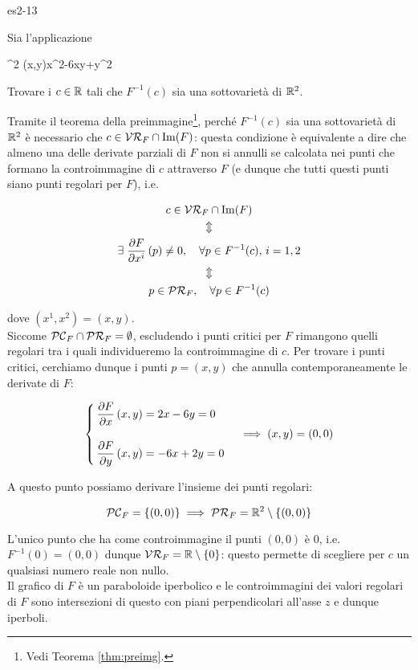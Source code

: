 {es2-13}
{
Sia l'applicazione

	{\R^{2}}{\R}
	{(x,y)}{x^{2}-6xy+y^{2}}

Trovare i $ c \in \mathbb{R} $ tali che $ F^{-1}(c) $ sia una sottovarietà di $ \mathbb{R}^{2} $.
}
{
Tramite il teorema della preimmagine\footnote{%
	Vedi Teorema \ref{thm:preimg}.%
}, perché $ F^{-1}(c) $ sia una sottovarietà di $ \mathbb{R}^{2} $ è necessario che $ c \in \mathcal{VR}_{F} \cap \Im(F) $: questa condizione è equivalente a dire che almeno una delle derivate parziali di $ F $ non si annulli se calcolata nei punti che formano la controimmagine di $ c $ attraverso $ F $ (e dunque che tutti questi punti siano punti regolari per $ F $), i.e.

\begin{gather}
	c \in \VR_{F} \cap \Im(F) \nonumber \\
	\Updownarrow \nonumber \\
	\E \pdv{F}{x^{i}} \, (p) \neq 0 \qcomma \forall p \in F^{-1}(c), \, i=1,2 \\
	\Updownarrow \nonumber \\
	p \in \PR_{F} \qcomma \forall p \in F^{-1}(c) \nonumber
\end{gather}

dove $ (x^{1},x^{2}) = (x,y) $. \\
Siccome $ \mathcal{PC}_{F} \cap \mathcal{PR}_{F} = \emptyset $, escludendo i punti critici per $ F $ rimangono quelli regolari tra i quali individueremo la controimmagine di $ c $. Per trovare i punti critici, cerchiamo dunque i punti $ p = (x,y) $ che annulla contemporaneamente le derivate di $ F $:

\begin{equation}
	\begin{cases}
		\dpdv{F}{x} \, (x,y) = 2 x - 6 y = 0 \\ \\
		\dpdv{F}{y} \, (x,y) = - 6 x + 2 y = 0
	\end{cases} %
	\implies %
	(x,y) = (0,0)
\end{equation}

A questo punto possiamo derivare l'insieme dei punti regolari:

\begin{equation}
	\PC_{F} = \{(0,0)\} %
	\implies %
	\PR_{F} = \R^{2} \setminus \{(0,0)\}
\end{equation}

L'unico punto che ha come controimmagine il punti $ (0,0) $ è $ 0 $, i.e. $ F^{-1}(0) = (0,0) $ dunque $ \mathcal{VR}_{F} = \mathbb{R} \setminus \{0\} $: questo permette di scegliere per $ c $ un qualsiasi numero reale non nullo. \\
Il grafico di $ F $ è un paraboloide iperbolico e le controimmagini dei valori regolari di $ F $ sono intersezioni di questo con piani perpendicolari all'asse $ z $ e dunque iperboli.
}

